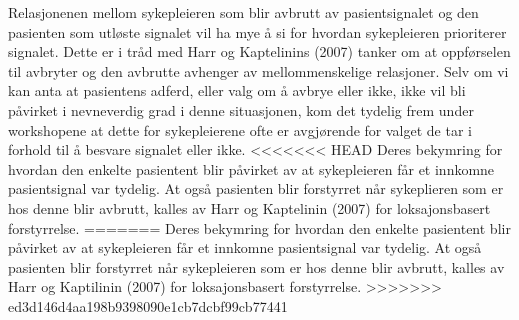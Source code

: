 \noindent
Relasjonenen mellom sykepleieren som blir avbrutt av pasientsignalet og den pasienten som utløste signalet vil ha mye å si for hvordan sykepleieren prioriterer signalet. Dette er i tråd med Harr og Kaptelinins (2007) tanker om at oppførselen til avbryter og den avbrutte avhenger av mellommenskelige relasjoner. Selv om vi kan anta at pasientens adferd, eller valg om å avbrye eller ikke, ikke vil bli påvirket i nevneverdig grad i denne situasjonen, kom det tydelig frem under workshopene at dette for sykepleierene ofte er avgjørende for valget de tar i forhold til å besvare signalet eller ikke.  
<<<<<<< HEAD
Deres bekymring for hvordan den enkelte pasientent blir påvirket av at sykepleieren får et innkomne pasientsignal var tydelig. At også pasienten blir forstyrret når sykeplieren som er hos denne blir avbrutt, kalles av Harr og Kaptelinin (2007) for loksajonsbasert forstyrrelse. 
=======
Deres bekymring for hvordan den enkelte pasientent blir påvirket av at sykepleieren får et innkomne pasientsignal var tydelig. At også pasienten blir forstyrret når sykepleieren som er hos denne blir avbrutt, kalles av Harr og Kaptilinin (2007) for loksajonsbasert forstyrrelse. 
>>>>>>> ed3d146d4aa198b9398090e1cb7dcbf99cb77441
